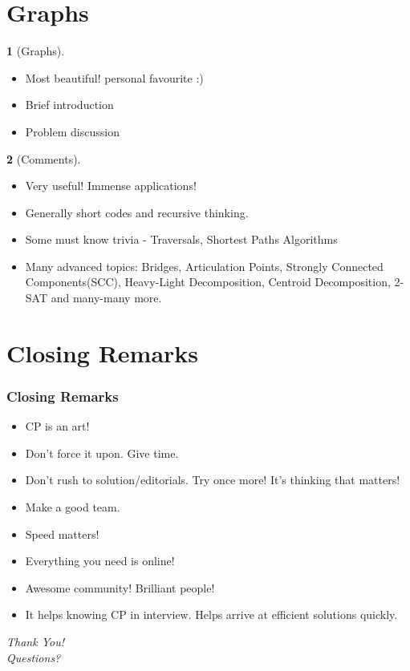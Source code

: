 \documentclass[mathserif,notheorems]{beamer} %
\theoremstyle{plain} %
\theoremstyle{definition} %
\newtheorem*{definition}{}%
\begin{document}
\section{Graphs}
\begin{frame}
\begin{definition}[Graphs]
	\begin{itemize}
		\item Most beautiful! personal favourite :)
		\item Brief introduction
		\item Problem discussion
	\end{itemize}
\end{definition}
\begin{definition}[Comments]
	\begin{itemize}
		\item Very useful! Immense applications!
		\item Generally short codes and recursive thinking.
		\item Some must know trivia - Traversals, Shortest Paths Algorithms
		\item Many advanced topics: Bridges, Articulation Points, Strongly Connected Components(SCC), Heavy-Light Decomposition, Centroid Decomposition, 2-SAT and many-many more.
	\end{itemize}
\end{definition}
\end{frame}

\section{Closing Remarks}
\begin{frame}
\frametitle{Closing Remarks}
	\begin{itemize}
		\item CP is an art!
		\item Don't force it upon. Give time.
		\item Don't rush to solution/editorials. Try once more! It's thinking that matters!
		\item Make a good team.
		\item Speed matters!
		\item Everything you need is online! 
		\item Awesome community! Brilliant people!
		\item It helps knowing CP in interview. Helps arrive at efficient solutions quickly.
	\end{itemize}
\end{frame}

\begin{frame}{}
  \centering \Huge
  \emph{Thank You!\\}
  \Huge
  \emph{Questions?}
\end{frame}
\end{document}
